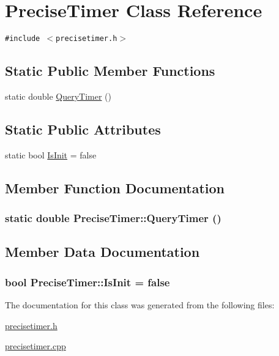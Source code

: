 \hypertarget{class_precise_timer}{
\section{PreciseTimer Class Reference}
\label{class_precise_timer}
}
{\tt \#include $<$precisetimer.h$>$}

\subsection*{Static Public Member Functions}
\begin{CompactItemize}
\item 
static double \hyperlink{class_precise_timer_f0b6721ee8632529a607903dd77ea231}{QueryTimer} ()
\end{CompactItemize}
\subsection*{Static Public Attributes}
\begin{CompactItemize}
\item 
static bool \hyperlink{class_precise_timer_1daff8b1f34778ddc066285a63ffd3bd}{IsInit} = false
\end{CompactItemize}


\subsection{Member Function Documentation}
\hypertarget{class_precise_timer_f0b6721ee8632529a607903dd77ea231}{
\subsubsection[{QueryTimer}]{\setlength{\rightskip}{0pt plus 5cm}static double PreciseTimer::QueryTimer ()}}
\label{class_precise_timer_f0b6721ee8632529a607903dd77ea231}




\subsection{Member Data Documentation}
\hypertarget{class_precise_timer_1daff8b1f34778ddc066285a63ffd3bd}{
\subsubsection[{IsInit}]{\setlength{\rightskip}{0pt plus 5cm}bool {\bf PreciseTimer::IsInit} = false}}
\label{class_precise_timer_1daff8b1f34778ddc066285a63ffd3bd}




The documentation for this class was generated from the following files:\begin{CompactItemize}
\item 
\hyperlink{precisetimer_8h}{precisetimer.h}\item 
\hyperlink{precisetimer_8cpp}{precisetimer.cpp}\end{CompactItemize}
